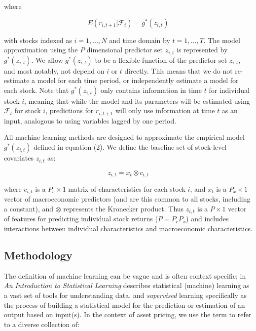 \documentclass[11pt, a4paper, table]{article}
\begin{document}
where 

\begin{equation}
	E(r_{i, t+1} | \mathcal{F}_t) = g^*(z_{i,t})
\end{equation}

with stocks indexed as $i = 1, \dots, N$ and time domain by $t = 1, \dots, T$. The model approximation using the $P$ dimensional predictor set $z_{i,t}$ is represented by $g^*(z_{i,t})$. We allow $g^*(z_{i,t})$ to be a flexible function of the predictor set $z_{i,t}$, and most notably, not depend on $i$ or $t$ directly. This means that we do not re-estimate a model for each time period, or independently estimate a model for each stock. Note that $g^*(z_{i,t})$ only contains information in time $t$ for individual stock $i$, meaning that while the model and its parameters will be estimated using $\mathcal{F}_t$ for stock $i$, predictions for $r_{i, t+1}$ will only use information at time $t$ as an input, analogous to using variables lagged by one period. 

All machine learning methods are designed to approximate the empirical model $g^*(z_{i,t})$ defined in equation (2). We define the baseline set of stock-level covariates \( z_{i,t} \) as:

\begin{equation}
\label{kronecker_equation}
z_{i,t} = x_t \otimes c_{i,t}
\end{equation}

where \( c_{i,t} \) is a \( P_c \times 1 \) matrix of characteristics for each stock \(i\), and \(x_t\) is a $P_x \times 1$ vector of macroeconomic predictors (and are this common to all stocks, including a constant), and $\otimes$ represents the Kronecker product. Thus $z_{i,t}$ is a $P \times 1$ vector of features for predicting individual stock returns ($P = P_cP_x$) and includes interactions between individual characteristics and macroeconomic characteristics. 

\subsection{Methodology}

The definition of machine learning can be vague and is often context specific; \cite{hastie_elements_2009} in \textit{An Introduction to Statistical Learning} describes statistical (machine) learning as a vast set of tools for understanding data, and \textit{supervised} learning specifically as the process of building a statistical model for the prediction or estimation of an output based on input(s). In the context of asset pricing, we use the term to refer to a diverse collection of:
\end{document}
